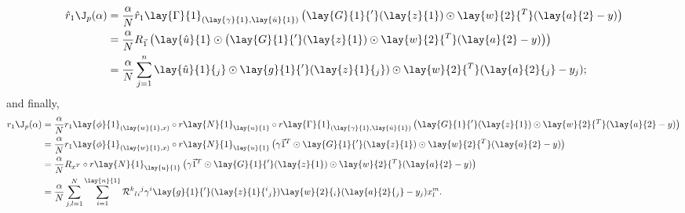 \begin{align*}
	\hat{r}_1\J_p(\alpha)&=\frac{\alpha}{N}\hat{r}_1\lay{\Gamma}{1}_{(\lay{\gamma}{1},\lay{\hat{u}}{1})}\left(\lay{G}{1}{'}(\lay{z}{1})\odot\lay{w}{2}{^T}(\lay{a}{2}-y)\right)\\
	&=\frac{\alpha}{N}R_{\vec{1}}\left(\lay{\hat{u}}{1}\odot \left(\lay{G}{1}{'}(\lay{z}{1})\odot\lay{w}{2}{^T}(\lay{a}{2}-y)\right) \right)\\
	&=\frac{\alpha}{N}\sum_{j=1}^n\lay{\hat{u}}{1}{_j}\odot\lay{g}{1}{'}(\lay{z}{1}{_j})\odot\lay{w}{2}{^T}(\lay{a}{2}{_j}-y_j); 
\end{align*}
and finally,
\begin{align*}
	r_1\J_p(\alpha)&=\frac{\alpha}{N}r_1\lay{\phi}{1}_{(\lay{w}{1},x)}\circ r\lay{N}{1}_{\lay{u}{1}}\circ r\lay{\Gamma}{1}_{(\lay{\gamma}{1},\lay{\hat{u}}{1})}\left(\lay{G}{1}{'}(\lay{z}{1})\odot\lay{w}{2}{^T}(\lay{a}{2}-y)\right)\\
	&=\frac{\alpha}{N}r_1\lay{\phi}{1}_{(\lay{w}{1},x)}\circ r\lay{N}{1}_{\lay{u}{1}}\left(\gamma\vec{1}^T\odot\lay{G}{1}{'}(\lay{z}{1})\odot\lay{w}{2}{^T}(\lay{a}{2}-y)\right)\\
	&=\frac{\alpha}{N}R_{x^T}\circ r\lay{N}{1}_{\lay{u}{1}}\left(\gamma\vec{1}^T\odot\lay{G}{1}{'}(\lay{z}{1})\odot\lay{w}{2}{^T}(\lay{a}{2}-y)\right)\\
	&=\frac{\alpha}{N}\sum_{j,l=1}^N\sum_{i=1}^{\lay{n}{1}}\mathcal{R}{{^k}{_l}{_i}{^j}}\gamma^i\lay{g}{1}{'}(\lay{z}{1}{^i{_j}})\lay{w}{2}{_i}(\lay{a}{2}{_j}-y_j)x^m_l.
\end{align*}

